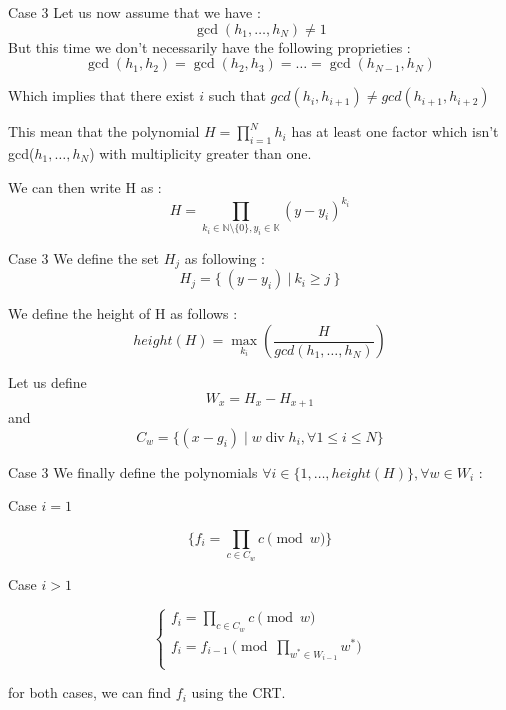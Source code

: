 \documentclass{beamer}
\DeclareMathOperator{\divides}{div}
\begin{document}
\begin{frame}{Case 3}
Let us now assume that we have :
\[\gcd(h_{1},\dots,h_{N}) \neq 1\]
But this time we don't necessarily have the following proprieties :
\[\gcd(h_{1},h_{2}) = \gcd(h_{2},h_{3}) = \dots = \gcd(h_{N-1},h_{N}) \]

Which implies that there exist $i$ such that $gcd(h_{i},h_{i+1}) \neq gcd(h_{i+1},h_{i+2})$

This mean that the polynomial $H = \prod_{i=1}^{N} h_{i}$ has at least one factor which isn't gcd($h_{1},\dots,h_{N}$) with multiplicity greater than one.

We can then write H as :
\[H=\prod_{k_{i} \in \mathbb{N}
 \setminus \{0\}, y_{i}\in \mathbb{K}} (y-y_{i})^{k_{i}}\]

\end{frame}

\begin{frame}{Case 3}
    We define the set $H_{j}$ as following :
\[H_{j} = \{\ (y-y_{i}) \ |\  k_{i} \geq j\ \}\]

We define the height of H as follows : \[height(H) = \max_{k_{i}}(\frac{H}{gcd(h_{1},\dots,h_{N})})\]

Let us define \[W_{x} = H_{x}-H_{x+1}\] and \[C_{w} = \{ (x-g_{i}) \mid w \divides h_{i}, \forall 1 \leq i \leq N \}\] \newline
\end{frame}

\begin{frame}{Case 3}
    We finally define the polynomials $\forall i \in \{1,\dots,height(H)\}, \forall w \in W_{i}$ :

Case $i = 1$

\[\{ f_{i} = \prod_{c \in C_{w} } c \pmod w \}\]

Case $i > 1$

\begin{displaymath}
    \left\{
    \begin{array}{ll}
    f_{i} = \prod_{c \in C_{w} } c \pmod w \\
    f_{i} = f_{i-1} \pmod{\prod_{w^{*} \in W_{i-1}} w^{*}}\\
    \end{array}
    \right.
\end{displaymath}

for both cases, we can find $f_{i}$ using the CRT\@.
\end{frame}
\end{document}

